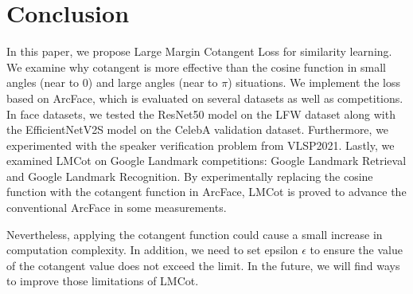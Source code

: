 \section{Conclusion}
In this paper, we propose Large Margin Cotangent Loss for similarity learning. We examine why cotangent is more effective than the cosine function in small angles (near to 0) and large angles (near to $\pi$) situations. We implement the loss based on ArcFace, which is evaluated on several datasets as well as competitions. In face datasets, we tested the ResNet50 model on the LFW dataset along with the EfficientNetV2S model on the CelebA validation dataset. Furthermore, we experimented with the speaker verification problem from VLSP2021. Lastly, we examined LMCot on Google Landmark competitions: Google Landmark Retrieval and Google Landmark Recognition. By experimentally replacing the cosine function with the cotangent function in ArcFace, LMCot is proved to advance the conventional ArcFace in some measurements.

Nevertheless, applying the cotangent function could cause a small increase in computation complexity. In addition, we need to set epsilon $\epsilon$ to ensure the value of the cotangent value does not exceed the limit. In the future, we will find ways to improve those limitations of LMCot.

